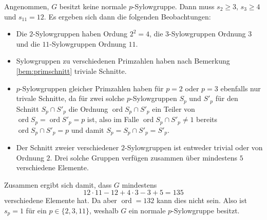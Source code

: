 \documentclass[a4paper,10pt]{article}
\theoremstyle{definition}
\newcommand{\ord}{\operatorname{ord}}
\begin{document}
Angenommen, $G$ besitzt keine normale $p$-Sylowgruppe. Dann muss $s_2 \geq 3$, $s_3 \geq 4$ und $s_{11} = 12$. Es ergeben sich dann die folgenden Beobachtungen:
\begin{itemize}
 \item Die $2$-Sylowgruppen haben Ordung $2^2=4$, die $3$-Sylowgruppen Ordnung $3$ und die $11$-Sylowgruppen Ordnung $11$.
 \item Sylowgruppen zu verschiedenen Primzahlen haben nach Bemerkung \ref{bem:primschnitt} triviale Schnitte.
 \item $p$-Sylowgruppen gleicher Primzahlen haben für $p = 2$ oder $p = 3$ ebenfalls nur trivale Schnitte, da für zwei solche $p$-Sylowgruppen $S_p$ und $S'_p$ für den Schnitt $S_p \cap S'_p$ die Ordnung $\ord S_p \cap S'_p$ ein Teiler von $\ord S_p = \ord S'_p = p$ ist, also im Falle $\ord S_p \cap S'_p \neq 1$ bereits $\ord S_p \cap S'_p = p$ und damit $S_p = S_p \cap S'_p = S'_p$.
 \item Der Schnitt zweier verschiedener $2$-Sylowgruppen ist entweder trivial oder von Ordnung $2$. Drei solche Gruppen verfügen zusammen über mindestens $5$ verschiedene Elemente.
\end{itemize}
Zusammen ergibt sich damit, dass $G$ mindestens
\[
 12 \cdot 11 - 12 + 4 \cdot 3 - 3 + 5 = 135
\]
verschiedene Elemente hat. Da aber $\ord = 132$ kann dies nicht sein. Also ist $s_p = 1$ für ein $p \in \{2,3,11\}$, weshalb $G$ ein normale $p$-Sylowgruppe besitzt.


 
\end{document}

